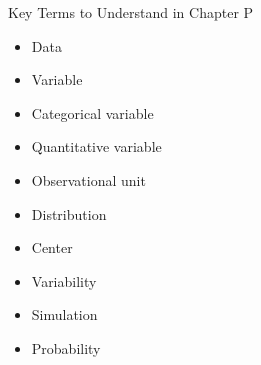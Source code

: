 \documentclass[13pt]{beamer}
\begin{document}
\begin{frame}{Key Terms to Understand in Chapter P}
\begin{multicols}{2}
\begin{itemize}
	\item Data
	\item Variable
    \item Categorical variable
    \item Quantitative variable
    \item Observational unit \\
    \item Distribution
    \item Center
    \item Variability \\
    \item Simulation
    \item Probability
\end{itemize}
\end{multicols}
\end{frame}
\end{document}
